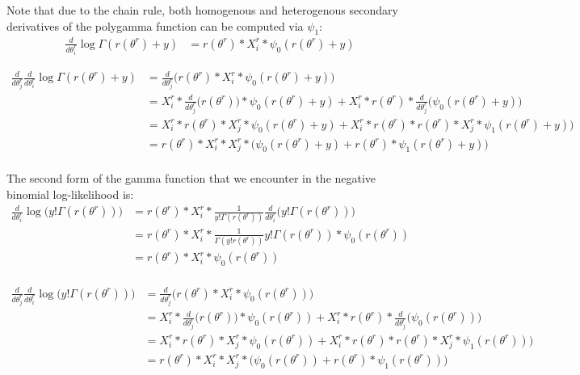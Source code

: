 \documentclass[bibliography=totoc,10pt]{scrartcl}
\begin{document}
Note that due to the chain rule, both homogenous and heterogenous secondary derivatives of the polygamma function can be computed via $\psi_1$:
\begin{equation}
\begin{split}
\frac{d}{d \theta^r_i} \log \Gamma(r(\theta^r)+y) &= r(\theta^r) * X^r_{i} * \psi_0(r(\theta^r)+y) 
\end{split}
\end{equation}

\begin{equation}
\begin{split}
\frac{d}{d \theta^r_j} \frac{d}{d \theta^r_i} \log \Gamma(r(\theta^r)+y) &= \frac{d}{d \theta^r_j} \bigg( r(\theta^r) * X^r_{i} * \psi_0(r(\theta^r)+y) \bigg) \\
&= X^r_{i} * \frac{d}{d \theta^r_j} \bigg( r(\theta^r)  \bigg)* \psi_0(r(\theta^r)+y) + X^r_{i} * r(\theta^r)  *  \frac{d}{d \theta^r_j} \bigg(  \psi_0(r(\theta^r)+y) \bigg)   \\
&= X^r_{i} * r(\theta^r) * X^r_{j} * \psi_0(r(\theta^r)+y) + X^r_{i} * r(\theta^r)  * r(\theta^r) * X^r_{j} *  \psi_1(r(\theta^r)+y) \bigg)   \\
&= r(\theta^r) * X^r_{i} * X^r_{j} * \bigg( \psi_0(r(\theta^r)+y) + r(\theta^r) *  \psi_1(r(\theta^r)+y) \bigg)   \\
\end{split}
\end{equation}

The second form of the gamma function that we encounter in the negative binomial log-likelihood is:
\begin{equation}
\begin{split}
\frac{d}{d \theta^r_i} \log \bigg(y! \Gamma(r(\theta^r))\bigg) &= r(\theta^r) * X^r_{i} * \frac{1}{y! \Gamma(r(\theta^r))} \frac{d}{d \theta^r_i} \bigg(y! \Gamma(r(\theta^r))\bigg) \\
&= r(\theta^r) * X^r_{i} * \frac{1}{\Gamma(y! r(\theta^r))}y! \Gamma(r(\theta^r))* \psi_0(r(\theta^r))  \\
&= r(\theta^r) * X^r_{i} * \psi_0(r(\theta^r))  \\
\end{split}
\end{equation}

\begin{equation}
\begin{split}
\frac{d}{d \theta^r_j} \frac{d}{d \theta^r_i}  \log \bigg(y! \Gamma(r(\theta^r))\bigg) &= \frac{d}{d \theta^r_j} \bigg( r(\theta^r) * X^r_{i} * \psi_0(r(\theta^r)) \bigg) \\
&= X^r_{i} * \frac{d}{d \theta^r_j} \bigg( r(\theta^r)  \bigg)* \psi_0(r(\theta^r)) + X^r_{i} * r(\theta^r)  *  \frac{d}{d \theta^r_j} \bigg(  \psi_0(r(\theta^r)) \bigg)   \\
&= X^r_{i} * r(\theta^r) * X^r_{j} * \psi_0(r(\theta^r)) + X^r_{i} * r(\theta^r)  * r(\theta^r) * X^r_{j} *  \psi_1(r(\theta^r)) \bigg)   \\
&= r(\theta^r) * X^r_{i} * X^r_{j} * \bigg( \psi_0(r(\theta^r)) + r(\theta^r) *  \psi_1(r(\theta^r)) \bigg)   \\
\end{split}
\end{equation}
\end{document}
